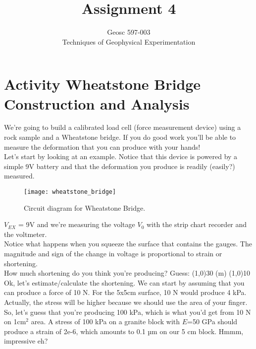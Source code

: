 \documentclass[10pt]{article}
\begin{document}

\title{Assignment 4}%
\author{Geosc 597-003\\
Techniques of Geophysical Experimentation} %

\maketitle




\section*{Activity Wheatstone Bridge Construction and Analysis}

We’re going to build a calibrated load cell (force measurement device) using a rock sample and a Wheatstone bridge.  If you do good work you’ll be able to measure the deformation that you can produce with your hands!  \\

Let’s start by looking at an example.  Notice that this device is powered by a simple 9V battery and that the deformation you produce is readily (easily?) measured. \\


\begin{figure}[ht]
	\centering
	\texttt{[image: wheatstone\_bridge]}
	\caption{Circuit diagram for Wheatstone Bridge.}
	\label{fig:wheatstone}
\end{figure}
 
$ V_{EX} $ = 9V and we’re measuring the voltage $ V_0 $ with the strip chart recorder and the voltmeter.\\

Notice what happens when you squeeze the surface that contains the gauges. The magnitude and sign of the change in voltage is proportional to strain or shortening.  \\

How much shortening do you think you’re producing? Guess: \line(1,0){30} (m) \line(1,0){10} \\

Ok, let’s estimate/calculate the shortening.  We can start by assuming that you can produce a force of 10 N.  For the 5x5cm surface, 10 N would produce 4 kPa. Actually, the stress will be higher because we should use the area of your finger. So, let’s guess that you’re producing 100 kPa, which is what you’d get from 10 N on 1cm$ ^2 $ area.  A stress of 100 kPa on a granite block with $ E $=50 GPa should produce a strain of 2e-6, which amounts to 0.1 µm on our 5 cm block. Hmmm, impressive eh? \\
\end{document}
